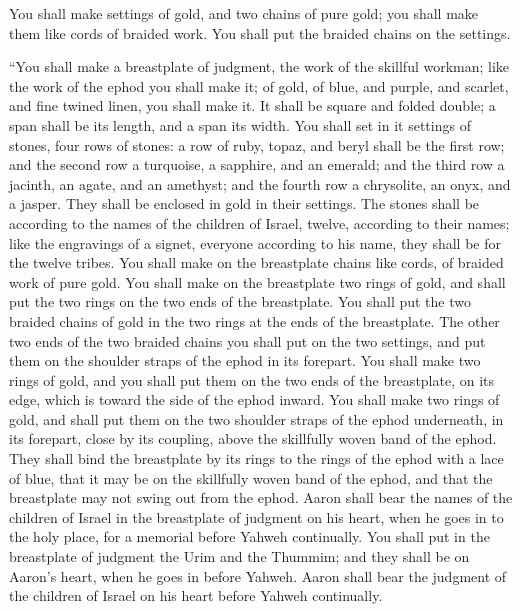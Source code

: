 {You shall make settings of gold,
and two chains of pure gold; you shall make them like cords of braided work. You shall put the braided chains on the settings.
\par }{\PP {}“You shall make a breastplate of judgment, the work of the skillful workman; like the work of the ephod you shall make it; of gold, of blue, and purple, and scarlet, and fine twined linen, you shall make it.
It shall be square and folded double; a span shall be its length, and a span its width.
You shall set in it settings of stones, four rows of stones: a row of ruby, topaz, and beryl shall be the first row;
and the second row a turquoise, a sapphire, and an emerald;
and the third row a jacinth, an agate, and an amethyst;
and the fourth row a chrysolite, an onyx, and a jasper. They shall be enclosed in gold in their settings.
The stones shall be according to the names of the children of Israel, twelve, according to their names; like the engravings of a signet, everyone according to his name, they shall be for the twelve tribes.
You shall make on the breastplate chains like cords, of braided work of pure gold.
You shall make on the breastplate two rings of gold, and shall put the two rings on the two ends of the breastplate.
You shall put the two braided chains of gold in the two rings at the ends of the breastplate.
The other two ends of the two braided chains you shall put on the two settings, and put them on the shoulder straps of the ephod in its forepart.
You shall make two rings of gold, and you shall put them on the two ends of the breastplate, on its edge, which is toward the side of the ephod inward.
You shall make two rings of gold, and shall put them on the two shoulder straps of the ephod underneath, in its forepart, close by its coupling, above the skillfully woven band of the ephod.
They shall bind the breastplate by its rings to the rings of the ephod with a lace of blue, that it may be on the skillfully woven band of the ephod, and that the breastplate may not swing out from the ephod.
Aaron shall bear the names of the children of Israel in the breastplate of judgment on his heart, when he goes in to the holy place, for a memorial before Yahweh continually.
You shall put in the breastplate of judgment the Urim and the Thummim; and they shall be on Aaron’s heart, when he goes in before Yahweh. Aaron shall bear the judgment of the children of Israel on his heart before Yahweh continually.
}
